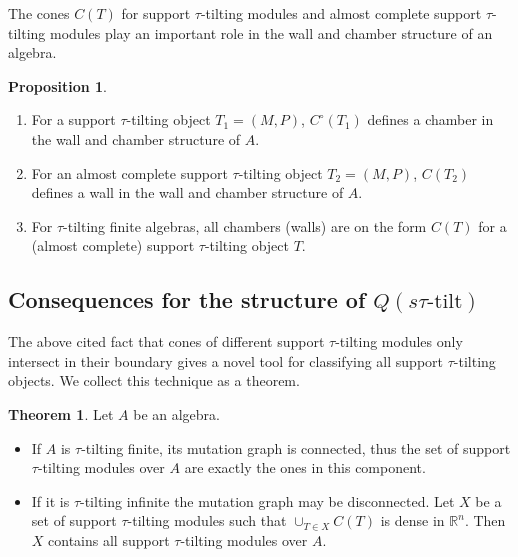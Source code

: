 \documentclass[]{article}
\theoremstyle{definition}
\newtheorem{theorem}{Theorem}[section]
\newtheorem{proposition}{Proposition}[section]
\newcommand{\tu}{\ensuremath{\tau}}
\begin{document}
The cones $C(T)$ for support \tu-tilting modules and almost complete support \tu-tilting modules play an important role in the wall and chamber structure of an algebra.

\begin{proposition}\cite[Proposition 3.15, Corollary 3.16, Corollary 3.21]{Br_stle_2019}\label{tau-wall-chamber-result}
	\begin{enumerate}
		\item For a support \tu-tilting object $T_1 = (M,P)$, $C^\circ(T_1)$ defines a chamber in the wall and chamber structure of $A$.
		\item For an almost complete support \tu-tilting object $T_2 = (M,P)$, $C(T_2)$ defines a wall in the wall and chamber structure of $A$.
		\item For \tu-tilting finite algebras, all chambers (walls) are on the form $C(T)$ for a (almost complete) support \tu-tilting object $T$.
		
	\end{enumerate}
\end{proposition}



\subsection{Consequences for the structure of $Q(s\tu\text{-tilt})$}

The above cited fact that cones of different support \tu-tilting modules only intersect in their boundary gives a novel tool for classifying all support \tu-tilting objects. We collect this technique as a theorem.

\begin{theorem}
	Let $A$ be an algebra.
	
	\begin{itemize}
		\item If $A$ is \tu-tilting finite, its mutation graph is connected, thus the set of support \tu-tilting modules over $A$ are exactly the ones in this component.
		\item If it is \tu-tilting infinite the mutation graph may be disconnected. Let $X$ be a set of support \tu-tilting modules such that $\cup_{T \in X} C(T)$ is dense in $\mathbb{R}^n$. Then $X$ contains all support \tu-tilting modules over $A$.
		
	\end{itemize}
\end{theorem}
\end{document}
